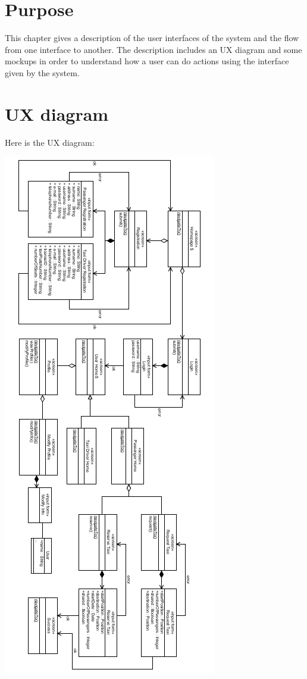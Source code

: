 \section{Purpose}

This chapter gives a description of the user interfaces of the system and the flow from one interface to another. The description includes an UX diagram and some mockups in order to understand how a user can do actions using the interface given by the system.

\section{UX diagram}
Here is the UX diagram:
	\begin{center}
		\includegraphics[height=\textheight]{diagrams/UX.png}
	\end{center}

